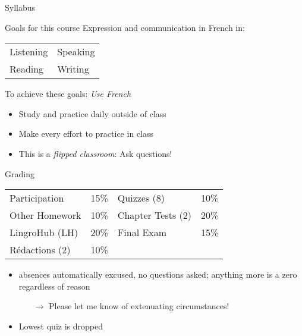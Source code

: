 \begin{frame}
  \begin{center}
    \Huge{Syllabus}
  \end{center}
\end{frame}

\begin{frame}{Goals for this course}
  Expression and communication in French in:
  \begin{center}
    \begin{tabular}{l l}
      Listening & Speaking \\
      Reading   & Writing \\
    \end{tabular}
  \end{center}
  To achieve these goals: \emph{Use French}
  \begin{itemize}
    \item Study and practice \alert{daily} outside of class
    \item Make every effort to practice in class
    \item This is a \emph{flipped classroom}: \alert{Ask questions!}
  \end{itemize}
\end{frame}

\begin{frame}{Grading}
  \begin{center}
    \begin{tabular}{l l | l l}
      Participation  & 15\% & Quizzes (8)       & 10\% \\
      Other Homework & 10\% & Chapter Tests (2) & 20\% \\
      LingroHub (LH) & 20\% & Final Exam        & 15\% \\
      Rédactions (2) & 10\% &                   &
    \end{tabular}
  \end{center}
  \begin{itemize}
    \item \absences{} absences automatically excused, no questions asked; anything more is a zero regardless of reason
    \begin{itemize}
      \item[$\to$] Please let me know of extenuating circumstances!
    \end{itemize}
    \item Lowest quiz is dropped
  \end{itemize}
\end{frame}



